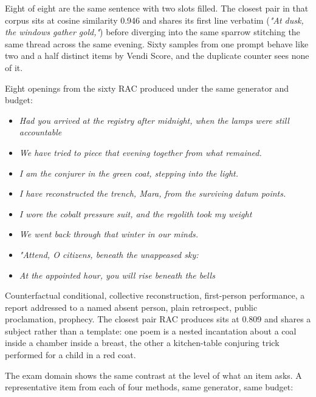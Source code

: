 \documentclass[
  10pt,
]{article}
\providecommand{\tightlist}{%
  \setlength{\itemsep}{0pt}\setlength{\parskip}{0pt}}
\theoremstyle{plain}
\theoremstyle{definition}
\providecommand{\tightlist}{\setlength{\itemsep}{0pt}\setlength{\parskip}{0pt}}
\begin{document}
Eight of eight are the same sentence with two slots filled. The closest
pair in that corpus sits at cosine similarity 0.946 and shares its first
line verbatim (\emph{"At dusk, the windows gather gold,"}) before
diverging into the same sparrow stitching the same thread across the
same evening. Sixty samples from one prompt behave like two and a half
distinct items by Vendi Score, and the duplicate counter sees none of
it.

Eight openings from the sixty RAC produced under the same generator and
budget:

\begin{itemize}
\tightlist
\item
  \emph{Had you arrived at the registry after midnight, when the lamps
  were still accountable}
\item
  \emph{We have tried to piece that evening together from what
  remained.}
\item
  \emph{I am the conjurer in the green coat, stepping into the light.}
\item
  \emph{I have reconstructed the trench, Mara, from the surviving datum
  points.}
\item
  \emph{I wore the cobalt pressure suit, and the regolith took my
  weight}
\item
  \emph{We went back through that winter in our minds.}
\item
  \emph{"Attend, O citizens, beneath the unappeased sky:}
\item
  \emph{At the appointed hour, you will rise beneath the bells}
\end{itemize}

Counterfactual conditional, collective reconstruction, first-person
performance, a report addressed to a named absent person, plain
retrospect, public proclamation, prophecy. The closest pair RAC produces
sits at 0.809 and shares a subject rather than a template: one poem is a
nested incantation about a coal inside a chamber inside a breast, the
other a kitchen-table conjuring trick performed for a child in a red
coat.

The exam domain shows the same contrast at the level of what an item
asks. A representative item from each of four methods, same generator,
same budget:
\end{document}
